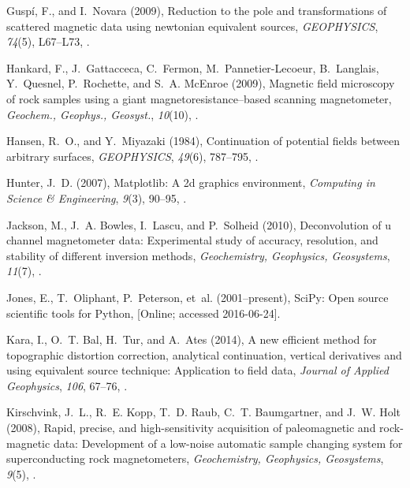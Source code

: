 \documentclass[draft,gc]{agutex}
\begin{document}
\begin{article}
\begin{thebibliography}{56}
Gusp\'{i}, F., and I.~Novara (2009), Reduction to the pole and transformations
  of scattered magnetic data using newtonian equivalent sources,
  \textit{GEOPHYSICS}, \textit{74}(5), L67--L73, .

Hankard, F., J.~Gattacceca, C.~Fermon, M.~Pannetier-Lecoeur, B.~Langlais,
  Y.~Quesnel, P.~Rochette, and S.~A. McEnroe (2009), Magnetic field microscopy
  of rock samples using a giant magnetoresistance–based scanning
  magnetometer, \textit{Geochem., Geophys., Geosyst.}, \textit{10}(10),
  .

Hansen, R.~O., and Y.~Miyazaki (1984), Continuation of potential fields between
  arbitrary surfaces, \textit{GEOPHYSICS}, \textit{49}(6), 787--795,
  .

Hunter, J.~D. (2007), Matplotlib: A 2d graphics environment, \textit{Computing
  in Science \& Engineering}, \textit{9}(3), 90--95,
  .

Jackson, M., J.~A. Bowles, I.~Lascu, and P.~Solheid (2010), Deconvolution of u
  channel magnetometer data: Experimental study of accuracy, resolution, and
  stability of different inversion methods, \textit{Geochemistry, Geophysics,
  Geosystems}, \textit{11}(7), .

Jones, E., T.~Oliphant, P.~Peterson, et~al. (2001--present), {SciPy}: Open
  source scientific tools for {Python}, [Online; accessed 2016-06-24].

Kara, I., O.~T. Bal, H.~Tur, and A.~Ates (2014), A new efficient method for
  topographic distortion correction, analytical continuation, vertical
  derivatives and using equivalent source technique: Application to field data,
  \textit{Journal of Applied Geophysics}, \textit{106}, 67--76,
  .

Kirschvink, J.~L., R.~E. Kopp, T.~D. Raub, C.~T. Baumgartner, and J.~W. Holt
  (2008), Rapid, precise, and high-sensitivity acquisition of paleomagnetic and
  rock-magnetic data: Development of a low-noise automatic sample changing
  system for superconducting rock magnetometers, \textit{Geochemistry,
  Geophysics, Geosystems}, \textit{9}(5), .


\end{thebibliography}
\end{article}
\end{document}
